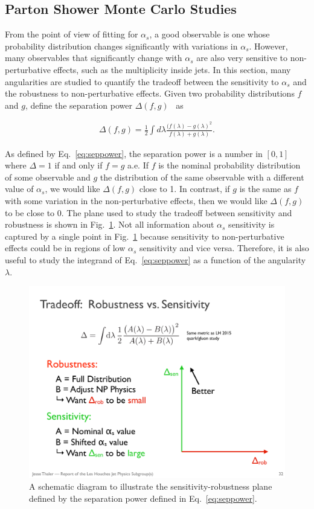 \subsection{Parton Shower Monte Carlo Studies}


From the point of view of fitting for $\alpha_s$, a good observable is one whose probability distribution changes significantly with variations in $\alpha_s$.  However, many observables that significantly change with $\alpha_s$ are also very sensitive to non-perturbative effects, such as the multiplicity inside jets.  In this section, many angularities are studied to quantify the tradeoff between the sensitivity to $\alpha_s$ and the robustness to non-perturbative effects.  Given two probability distributions $f$ and $g$, define the separation power $\Delta(f,g)$~\cite{Harrison:1998yr} as

\begin{align}
\label{eq:seppower}
\Delta(f,g)=\frac{1}{2}\int d\lambda \frac{(f(\lambda)-g(\lambda)^2}{f(\lambda)+g(\lambda)}.
\end{align}

\noindent As defined by Eq.~\ref{eq:seppower}, the separation power is a number in $[0,1]$ where $\Delta=1$ if and only if $f=g$ a.e.  If $f$ is the nominal probability distribution of some observable and $g$ the distribution of the same observable with a different value of $\alpha_s$, we would like $\Delta(f,g)$ close to 1.  In contrast, if $g$ is the same as $f$ with some variation in the non-perturbative effects, then we would like $\Delta(f,g)$ to be close to $0$.  The plane used to study the tradeoff between sensitivity and robustness is shown in Fig.~\ref{fig:robustnessschematic}.  Not all information about $\alpha_s$ sensitivity is captured by a single point in Fig.~\ref{fig:robustnessschematic} because sensitivity to non-perturbative effects could be in regions of low $\alpha_s$ sensitivity and vice versa.  Therefore, it is also useful to study the integrand of Eq.~\ref{eq:seppower} as a function of the angularity $\lambda$.

\begin{figure}[h!]
\begin{center}
\includegraphics[width = 0.4\columnwidth]{figures/robustnessschematic.pdf}
\end{center}
\caption{A schematic diagram to illustrate the sensitivity-robustness plane defined by the separation power defined in Eq.~\ref{eq:seppower}.}
\label{fig:robustnessschematic}
\end{figure}

